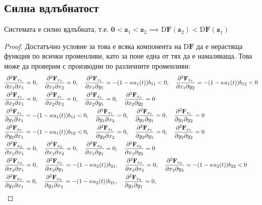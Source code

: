 \subsection{Силна вдлъбнатост}
\begin{proposition}
  Системата е силно вдлъбната, т.е. $\mathbf{0} < \mathbf{z}_1 < \mathbf{z}_2 \implies \mathrm{D}\mathbf{F}(\mathbf{z}_2) < \mathrm{D}\mathbf{F}(\mathbf{z}_1)$
\end{proposition}
\begin{proof}

  Достатъчно условие за това е всяка компонента на $\mathrm{D}\mathbf{F}$ да е нерастяща функция по всички променливи, като за поне една от тях да е намаляваща. Това може да проверим с производни по различните променливи:
{\allowdisplaybreaks
  \begin{align*}
    &\pdv{\mathbf{F}_{x_1}}{x_1}{x_1} = 0, \quad
    \pdv{\mathbf{F}_{x_1}}{x_1}{x_2} = 0, \quad
    \pdv{\mathbf{F}_{x_1}}{x_1}{y_1} = -(1-\kappa u_1(t)) b_{11} < 0, \quad
    \pdv{\mathbf{F}_{x_1}}{x_1}{y_2} = -(1-\kappa u_1(t)) b_{12} < 0 \\
    &\pdv{\mathbf{F}_{x_1}}{x_2}{x_1} = 0, \quad
    \pdv{\mathbf{F}_{x_1}}{x_2}{x_2} = 0, \quad
    \pdv{\mathbf{F}_{x_1}}{x_2}{y_1} = 0, \quad
    \pdv{\mathbf{F}_{x_1}}{x_2}{y_2} = 0 \\
    &\pdv{\mathbf{F}_{x_1}}{y_1}{x_1} = -(1-\kappa u_1(t)) b_{11} < 0, \quad
    \pdv{\mathbf{F}_{x_1}}{y_1}{x_2} = 0, \quad
    \pdv{\mathbf{F}_{x_1}}{y_1}{y_1} = 0, \quad
    \pdv{\mathbf{F}_{x_1}}{y_1}{y_2} = 0 \\
    &\pdv{\mathbf{F}_{x_1}}{y_2}{x_1} = -(1-\kappa u_1(t)) b_{12} < 0, \quad
    \pdv{\mathbf{F}_{x_1}}{y_2}{x_2} = 0, \quad
    \pdv{\mathbf{F}_{x_1}}{y_2}{y_1} = 0, \quad
    \pdv{\mathbf{F}_{x_1}}{y_2}{y_2} = 0 \\
    &\pdv{\mathbf{F}_{x_2}}{x_1}{x_1} = 0, \quad
    \pdv{\mathbf{F}_{x_2}}{x_1}{x_2} = 0, \quad
    \pdv{\mathbf{F}_{x_2}}{x_1}{y_1} = 0, \quad
    \pdv{\mathbf{F}_{x_2}}{x_1}{y_2} = 0 \\
    &\pdv{\mathbf{F}_{x_2}}{x_2}{x_1} = 0, \quad
    \pdv{\mathbf{F}_{x_2}}{x_2}{y_1} = -(1-\kappa u_2(t)) b_{21}, \quad
    \pdv{\mathbf{F}_{x_2}}{x_2}{x_2} = 0, \quad
    \pdv{\mathbf{F}_{x_2}}{x_2}{y_2} = -(1-\kappa u_2(t)) b_{22} < 0 \\
    &\pdv{\mathbf{F}_{x_2}}{y_1}{x_1} = 0, \quad
    \pdv{\mathbf{F}_{x_2}}{y_1}{x_2} = -(1-\kappa u_2(t)) b_{21}, \quad
    \pdv{\mathbf{F}_{x_2}}{y_1}{y_1} = 0, \quad

\end{align*}}
\end{proof}
